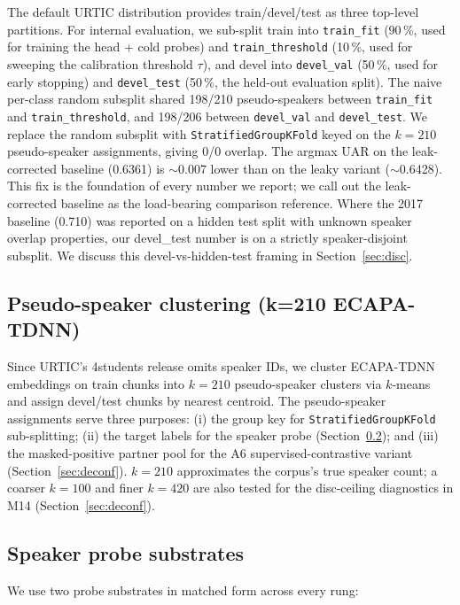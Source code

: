 The default URTIC distribution provides train/devel/test as three top-level partitions. For internal evaluation, we sub-split train into \texttt{train\_fit} (90\,\%, used for training the head + cold probes) and \texttt{train\_threshold} (10\,\%, used for sweeping the calibration threshold $\tau$), and devel into \texttt{devel\_val} (50\,\%, used for early stopping) and \texttt{devel\_test} (50\,\%, the held-out evaluation split). The naive per-class random subsplit shared 198/210 pseudo-speakers between \texttt{train\_fit} and \texttt{train\_threshold}, and 198/206 between \texttt{devel\_val} and \texttt{devel\_test}. We replace the random subsplit with \texttt{StratifiedGroupKFold} keyed on the $k{=}210$ pseudo-speaker assignments, giving 0/0 overlap. The argmax UAR on the leak-corrected baseline (0.6361) is $\sim$0.007 lower than on the leaky variant ($\sim$0.6428). This fix is the foundation of every number we report; we call out the leak-corrected baseline as the load-bearing comparison reference. Where the 2017 baseline (0.710) was reported on a hidden test split with unknown speaker overlap properties, our devel\_test number is on a strictly speaker-disjoint subsplit. We discuss this devel-vs-hidden-test framing in Section~\ref{sec:disc}.

\subsection{Pseudo-speaker clustering (k=210 ECAPA-TDNN)}
\label{ssec:pseudo}

Since URTIC's 4students release omits speaker IDs, we cluster ECAPA-TDNN embeddings on train chunks into $k{=}210$ pseudo-speaker clusters via $k$-means and assign devel/test chunks by nearest centroid. The pseudo-speaker assignments serve three purposes: (i) the group key for \texttt{StratifiedGroupKFold} sub-splitting; (ii) the target labels for the speaker probe (Section~\ref{ssec:probes}); and (iii) the masked-positive partner pool for the A6 supervised-contrastive variant (Section~\ref{sec:deconf}). $k{=}210$ approximates the corpus's true speaker count; a coarser $k{=}100$ and finer $k{=}420$ are also tested for the disc-ceiling diagnostics in M14 (Section~\ref{sec:deconf}).

\subsection{Speaker probe substrates}
\label{ssec:probes}

We use two probe substrates in matched form across every rung:

